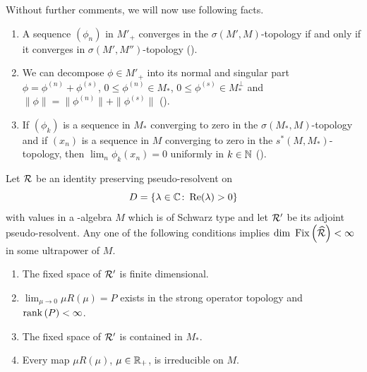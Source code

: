 \begin{remark}\label{rem:d4-remark}
Without further comments, we will now use following facts.
\begin{enumerate}[\upshape(i), wide, labelindent=.25em]
\item\label{rem:item1}
A sequence $ (\phi_{n}) $  in $ M'_{+} $  converges in the $ \sigma(M',M) $-topology if and only if it converges in $ \sigma(M',M'') $-topology (\textcite{akemann:1972}).

\item\label{rem:item2}
We can decompose $ \phi \in M'_{+} $  into its normal and singular part $ \phi = \phi^{(n)} + \phi^{(s)} $, $ 0 \leq \phi^{(n)} \in M_{*} $, $ 0 \leq \phi^{(s)} \in M_*^{\perp} $  and $ \|\phi\| = \|\phi^{(n)}\| + \|\phi^{(s)}\| $  (\textcite[Theorem III.2.14]{takesaki:1979}).

\item\label{rem:item3}
If\/ $ (\phi_{k}) $  is a sequence in $ M_{*} $  converging to zero in the $ \sigma(M_{*},M) $-topology and if\/ $ (x_{n}) $  is a sequence in $ M $  converging to zero in the $ s^{*}(M,M_{*}) $-topology, then $ \lim_{n} \phi_{k}(x_{n}) = 0 $  uniformly in $ k \in \mathbb{N} $  (\textcite[Lemma III.5.5]{takesaki:1979}).
\end{enumerate}
\end{remark}
\begin{theorem}\label{thm:d4-4.4}
Let $ \mathcal{R} $  be an identity preserving pseudo-resolvent on 
%
\[
	D = \{\lambda \in \mathbb{C} \colon  \mathop{}\!\mathrm{Re}(\lambda) > 0\} 
\]
%
with values in a \WA-algebra $ M $  which is of Schwarz type and let $ \mathcal{R}' $  be its adjoint pseudo-resolvent.
Any one of the following conditions implies $ \mathop{}\!\mathrm{dim}\, \mathop{}\mathrm{Fix}\left(\widehat{\mathcal{R}}\right) < \infty $  in some ultrapower of\/ $ M $.
\begin{enumerate}[\upshape (i)]
\item
The fixed space of\/ $ \mathcal{R}' $  is finite dimensional.

\item
$ \lim_{\mu \to 0} \mu R(\mu) = P $  exists in the strong operator topology and $ \mathop{}\!\mathrm{rank}\, (P) < \infty $.

\item
The fixed space of\/ $ \mathcal{R}' $  is contained in $ M_{*} $.

\item
Every map $ \mu R(\mu) $, $ \mu \in \mathbb{R}_{+} $, is irreducible on $ M $.
\end{enumerate}
\end{theorem}
